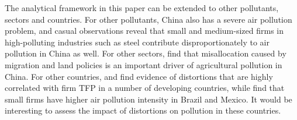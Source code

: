 \documentclass[AEJ]{AEA}
\begin{document}
The analytical framework in this paper can be extended to other pollutants, sectors and countries. For other pollutants, China also has a severe air pollution problem, and casual observations reveal that small and medium-sized firms in high-polluting industries such as steel contribute disproportionately to air pollution in China as well. For other sectors, \citet{AGpaper} find that misallocation caused by migration and land policies is an important driver of agricultural pollution in China. For other countries, \citet{HsiehKlenow:2014} and \citet{BentoRestuccia:2016} find evidence of distortions that are highly correlated with firm TFP in a number of developing countries, while \citet{Dasguptaetal:1998} find that small firms have higher air pollution intensity in Brazil and Mexico. It would be interesting to assess the impact of distortions on pollution in these countries.



\end{document}
